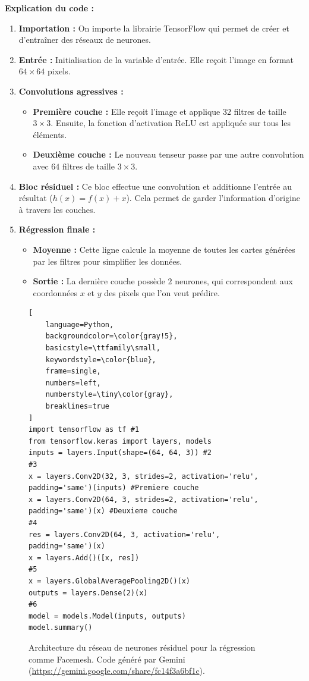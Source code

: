 \documentclass{rapportbrebeuf}
\begin{document}
\textbf{Explication du code :}
\begin{enumerate}
    \item \textbf{Importation :} On importe la librairie TensorFlow qui permet de créer et d'entraîner des réseaux de neurones.
    \item \textbf{Entrée :} Initialisation de la variable d'entrée. Elle reçoit l'image en format $64 \times 64$ pixels.
    \item \textbf{Convolutions agressives :}
    \begin{itemize}
        \item \textbf{Première couche :} Elle reçoit l'image et applique $32$ filtres de taille $3 \times 3$. Ensuite, la fonction d'activation {ReLU} est appliquée sur tous les éléments.
        \item \textbf{Deuxième couche :} Le nouveau tenseur passe par une autre convolution avec $64$ filtres de taille $3 \times 3$.
    \end{itemize}
    \item \textbf{Bloc résiduel :} Ce bloc effectue une convolution et additionne l'entrée au résultat ($h(x) = f(x) + x$). Cela permet de garder l'information d'origine à travers les couches.
    \item \textbf{Régression finale :}
    \begin{itemize}
        \item \textbf{Moyenne :} Cette ligne calcule la moyenne de toutes les cartes générées par les filtres pour simplifier les données.
        \item \textbf{Sortie :} La dernière couche possède $2$ neurones, qui correspondent aux coordonnées $x$ et $y$ des pixels que l'on veut prédire.
    \end{itemize}
\end{enumerate}

\newpage
\begin{figure}[htbp]
\centering
\begin{lstlisting}[
    language=Python,
    backgroundcolor=\color{gray!5},
    basicstyle=\ttfamily\small,
    keywordstyle=\color{blue},
    frame=single,
    numbers=left,
    numberstyle=\tiny\color{gray},
    breaklines=true
]
import tensorflow as tf #1
from tensorflow.keras import layers, models
inputs = layers.Input(shape=(64, 64, 3)) #2
#3
x = layers.Conv2D(32, 3, strides=2, activation='relu', padding='same')(inputs) #Premiere couche
x = layers.Conv2D(64, 3, strides=2, activation='relu', padding='same')(x) #Deuxieme couche 
#4
res = layers.Conv2D(64, 3, activation='relu', padding='same')(x) 
x = layers.Add()([x, res]) 
#5
x = layers.GlobalAveragePooling2D()(x) 
outputs = layers.Dense(2)(x) 
#6
model = models.Model(inputs, outputs)
model.summary()
\end{lstlisting}
\caption{Architecture du réseau de neurones résiduel pour la régression comme Facemesh. Code généré par Gemini (\href{https://gemini.google.com/share/fc14f3a6bf1c}{https://gemini.google.com/share/fc14f3a6bf1c}).}
\label{fig:code_resnet}
\end{figure}
\end{document}
